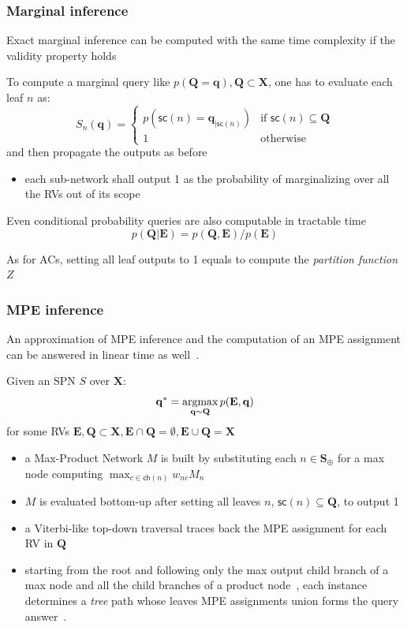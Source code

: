 \documentclass[10pt, t, xcolor={usenames,dvipsnames,svgnames}, compress]{beamer}
\newcommand{\argmax}{\operatornamewithlimits{argmax}}
\begin{document}
\begin{frame}
  \frametitle{Marginal inference}

Exact marginal inference can be computed with the same time complexity if the
validity property holds~\cite{Poon2011}

To compute a marginal query like $p(\mathbf{Q=q}),
\mathbf{Q}\subset\mathbf{X}$, one has to evaluate each leaf $n$ as:
\begin{equation}
  \label{eq:marg}
  S_{n}(\mathbf{q}) = \begin{cases}
    p(\mathsf{sc}(n) =\mathbf{q}_{|\mathsf{sc}(n)}) & \text{if $\mathsf{sc}(n)\subseteq\mathbf{Q}$} \\
    1 & \text{otherwise}
  \end{cases}
\end{equation}
and then propagate the outputs as before

\begin{itemize}
\item each sub-network shall output 1 as the probability of marginalizing
over all the RVs out of its scope
\end{itemize}

Even conditional probability queries are also computable
in tractable time
$$p(\mathbf{Q}|\mathbf{E}) = p(\mathbf{Q}, \mathbf{E})/p(\mathbf{E})$$

As for ACs, setting all leaf outputs to 1 equals to compute the \emph{partition function}
$Z$ 
\end{frame}

\begin{frame}
  \frametitle{MPE inference}
An approximation of MPE inference and the computation of an MPE
assignment can be answered in linear time as
well~\cite{Peharz2015b,Peharz2016}.

Given an SPN $S$ over $\mathbf{X}$:
\begin{equation}
\mathbf{q}^{*}=\argmax_{\mathbf{q}\sim \mathbf{Q}}p(\mathbf{E},
\mathbf{q})
\label{eq:mpe-ass}
\end{equation}
for some RVs $\mathbf{E}, \mathbf{Q} \subset\mathbf{X},
\mathbf{E}\cap\mathbf{Q}=\emptyset, \mathbf{E}\cup \mathbf{Q}=\mathbf{X}$

\begin{itemize}
\item a Max-Product Network $M$ is built by substituting each $n\in \mathbf S_{\oplus}$ for a max node computing
$\max_{c\in\mathsf{ch}(n)}w_{nc}M_{n}$
\item $M$ is evaluated bottom-up after setting all leaves $n$, $\mathsf{sc}(n)\subseteq
\mathbf{Q}$, to output 1
\item a Viterbi-like top-down traversal traces back the MPE
assignment for each RV in $\mathbf{Q}$
\item starting from the root and following only the max output
child branch of a max node and all the child branches
of a product node~\cite{Poon2011a}, each instance determines a
\emph{tree} path whose leaves MPE assignments union forms the
query answer~\cite{Darwiche2009}.
\end{itemize}
\end{frame}
\end{document}
